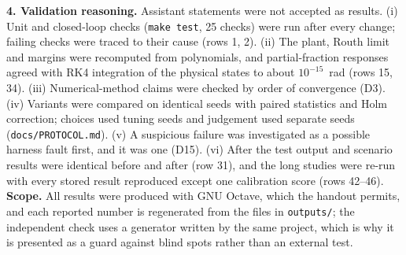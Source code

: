 \documentclass[conference]{IEEEtran}
\begin{document}
\textbf{4. Validation reasoning.} Assistant statements were not accepted as results. (i) Unit and closed-loop checks (\texttt{make test}, 25 checks) were run after every change; failing checks were traced to their cause (rows 1, 2). (ii) The plant, Routh limit and margins were recomputed from polynomials, and partial-fraction responses agreed with RK4 integration of the physical states to about $10^{-15}$~rad (rows 15, 34). (iii) Numerical-method claims were checked by order of convergence (D3). (iv) Variants were compared on identical seeds with paired statistics and Holm correction; choices used tuning seeds and judgement used separate seeds (\texttt{docs/PROTOCOL.md}). (v) A suspicious failure was investigated as a possible harness fault first, and it was one (D15). (vi) After the test output and scenario results were identical before and after (row 31), and the long studies were re-run with every stored result reproduced except one calibration score (rows 42--46). \textbf{Scope.} All results were produced with GNU Octave, which the handout permits, and each reported number is regenerated from the files in \texttt{outputs/}; the independent check uses a generator written by the same project, which is why it is presented as a guard against blind spots rather than an external test.
\end{document}
